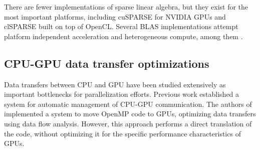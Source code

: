     There are fewer implementations of sparse linear algebra, but they exist for
    the most important platforms, including cuSPARSE \cite{cusparse} for NVIDIA
    GPUs and clSPARSE \cite{clsparse} built on top of OpenCL.
    Several BLAS implementations attempt platform independent acceleration and
    heterogeneous compute, among them \citet{Wang:2016:BHP:2925426.2926256,
    10.1007/978-3-319-64203-1_33, Diego2017Multi}. 


\subsection{CPU-GPU data transfer optimizations}

    Data transfers between CPU and GPU have been studied extensively as
    important bottlenecks for parallelization efforts.
    Previous work \cite{Jablin:2011:ACC:1993316.1993516} established a system
    for automatic management of CPU-GPU communication.
    The authors of \cite{Lee:2009:OGC:1594835.1504194} implemented a system to
    move OpenMP code to GPUs, optimizing data transfers using data flow
    analysis.
    However, this approach performs a direct translation of the code, without
    optimizing it for the specific performance characteristics of GPUs.


